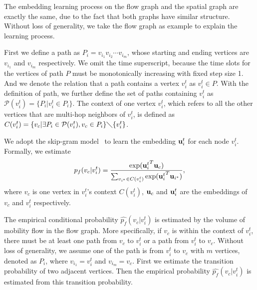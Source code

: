 The embedding learning process on the flow graph and the spatial graph are exactly the same, due to the fact that both graphs have similar structure. Without loss of generality, we take the flow graph as example to explain the learning process.


First we define a path as $P_i = v_{i_1} v_{i_2} \cdots v_{i_m}$, whose starting and ending vertices are $v_{i_1}$ and $v_{i_m}$ respectively. We omit the time superscript, because the time slots for the vertices of path $P$ must be monotonically increasing with fixed step size 1. And we denote the relation that a path contains a vertex $v_i^t$ as $v_i^t \in P$. With the definition of path, we further define the set of paths containing $v_i^t$ as $\mathcal{P}(v_i^t) = \{ P_i | v_i^t \in P_i \}$. The context of one vertex $v_i^t$, which refers to all the other vertices that are multi-hop neighbors of $v_i^t$, is defined as $C(v_i^t) = \{ v_c |  \exists P_i \in \mathcal{P}(v_i^t),  v_c \in P_i \} \diagdown \{v_i^t\} $.


We adopt the skip-gram model~\cite{mikolov2013efficient} to learn the embedding $\mathbf{u}_i^t$ for each node $v_i^t$.  Formally, we estimate
\begin{equation}
\label{eq:cp_real}
p_f(v_c | v_i^t) = \frac{\exp({\mathbf{u}_i^t}^T \mathbf{u}_c)}{\sum_{v_{i^*} \in C(v_i^t)} \exp({\mathbf{u}_i^t}^T \mathbf{u}_{i^*})},
\end{equation}
where $v_c$ is one vertex in $v_i^t$'s context $C(v_i^t)$, $\mathbf{u}_c$ and $\mathbf{u}_i^t$ are the embeddings of $v_c$ and $v_i^t$ respectively.


The empirical conditional probability $\hat{p_f}(v_c | v_i^t)$ is estimated by the volume of mobility flow in the flow graph. More specifically, if $v_c$ is within the context of $v_i^t$, there must be at least one path from $v_c$ to $v_i^t$ or a path from $v_i^t$ to $v_c$. Without loss of generality, we assume one of the path is from $v_i^t$ to $v_c$ with $m$ vertices, denoted as $P_i$, where $v_{i_1} = v_i^t$ and $v_{i_m} = v_c$. First we estimate the transition probability of two adjacent vertices. Then the empirical probability $\hat{p_f}(v_c | v_i^t)$ is estimated from this transition probability.

